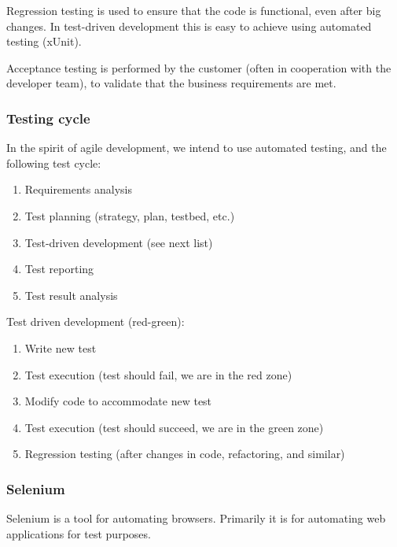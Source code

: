 Regression testing is used to ensure that the code is functional, even after big
changes. In test-driven development this is easy to achieve using automated
testing (xUnit).

Acceptance testing is performed by the customer (often in cooperation with the
developer team), to validate that the business requirements are met.

\subsubsection{Testing cycle}

In the spirit of agile development, we intend to use automated testing, and the
following test cycle:

\begin{enumerate}
	\item Requirements analysis
	\item Test planning (strategy, plan, testbed, etc.)
	\item Test-driven development (see next list)
	\item Test reporting
	\item Test result analysis
\end{enumerate}

Test driven development (red-green):
\begin{enumerate}
	\item Write new test
	\item Test execution (test should fail, we are in the red zone)
	\item Modify code to accommodate new test
	\item Test execution (test should succeed, we are in the green zone)
	\item Regression testing (after changes in code, refactoring, and similar)
\end{enumerate}

\subsubsection{Selenium}

	Selenium is a tool for automating browsers. Primarily it is for automating
	web applications for test purposes. \cite{seleniumhq:home}
